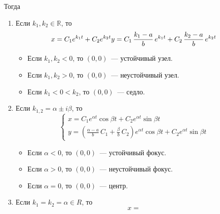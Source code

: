 Тогда
\begin{enumerate}
	\item Если $k_1, k_2 \in \mathbb R$, то
	\begin{equation*}
	x = C_1 e^{k_1 t} + C_2 e^{k_2 t} \\
	y = C_1\,\frac{k_1 - a}b\,e^{k_1 t} + C_2\,\frac{k_2 - a}b\,e^{k_2 t}
	\end{equation*}
	
	\begin{itemize}
		\item Если $k_1, k_2 < 0$, то $(0, 0)$~--- устойчивый узел.
		\item Если $k_1, k_2 > 0$, то $(0, 0)$~--- неустойчивый узел.
		\item Если $k_1 < 0 < k_2$, то $(0, 0)$~--- седло.
	\end{itemize}
	
	\item Если $k_{1,2} = \alpha \pm i \beta$, то
	\begin{equation*}
	\begin{cases}
	x = C_1 e^{\alpha t} \cos \beta t + C_2 e^{\alpha t} \sin \beta t \\
	y = \left( \frac{\alpha - a}b\,C_1 + \frac\beta{b}\,C_2 \right) e^{\alpha t} \cos \beta t + C_2 e^{\alpha t} \sin \beta t
	\end{cases}
	\end{equation*}
	
	\begin{itemize}
		\item Если $\alpha < 0$, то $(0, 0)$~--- устойчивый фокус.
		\item Если $\alpha > 0$, то $(0, 0)$~--- неустойчивый фокус.
		\item Если $\alpha = 0$, то $(0, 0)$~--- центр.
	\end{itemize}
	
	\item Если $k_1 = k_2 = \alpha \in R$, то
	\begin{equation*}
	x = 
	\end{equation*}
\end{enumerate}